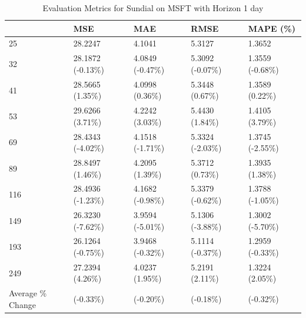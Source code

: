 \begin{table}
\caption{Evaluation Metrics for Sundial on MSFT with Horizon 1 day}
\label{tab:sundial_MSFT_h1_metrics}
\begin{tabular}{lllll}
\toprule
 & MSE & MAE & RMSE & MAPE (\%) \\
\midrule
25 & 28.2247 & 4.1041 & 5.3127 & 1.3652 \\
32 & 28.1872 (-0.13\%) & 4.0849 (-0.47\%) & 5.3092 (-0.07\%) & 1.3559 (-0.68\%) \\
41 & 28.5665 (1.35\%) & 4.0998 (0.36\%) & 5.3448 (0.67\%) & 1.3589 (0.22\%) \\
53 & 29.6266 (3.71\%) & 4.2242 (3.03\%) & 5.4430 (1.84\%) & 1.4105 (3.79\%) \\
69 & 28.4343 (-4.02\%) & 4.1518 (-1.71\%) & 5.3324 (-2.03\%) & 1.3745 (-2.55\%) \\
89 & 28.8497 (1.46\%) & 4.2095 (1.39\%) & 5.3712 (0.73\%) & 1.3935 (1.38\%) \\
116 & 28.4936 (-1.23\%) & 4.1682 (-0.98\%) & 5.3379 (-0.62\%) & 1.3788 (-1.05\%) \\
149 & 26.3230 (-7.62\%) & 3.9594 (-5.01\%) & 5.1306 (-3.88\%) & 1.3002 (-5.70\%) \\
193 & 26.1264 (-0.75\%) & 3.9468 (-0.32\%) & 5.1114 (-0.37\%) & 1.2959 (-0.33\%) \\
249 & 27.2394 (4.26\%) & 4.0237 (1.95\%) & 5.2191 (2.11\%) & 1.3224 (2.05\%) \\
Average \% Change & (-0.33\%) & (-0.20\%) & (-0.18\%) & (-0.32\%) \\
\bottomrule
\end{tabular}
\end{table}
